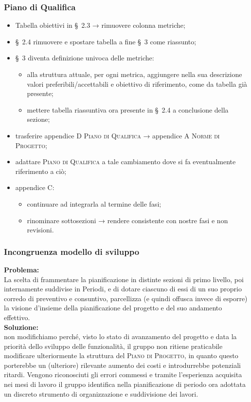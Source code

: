 \subsubsection{Piano di Qualifica}
\begin{itemize}
	\item Tabella obiettivi in \S\ 2.3 → rimuovere colonna metriche;
	
	\item \S\ 2.4 rimuovere e spostare tabella a fine \S\ 3 come riassunto;
	
	\item \S\ 3 diventa definizione univoca delle metriche:
	\begin{itemize}
		\item alla struttura attuale, per ogni metrica, aggiungere nella sua descrizione valori preferibili/accettabili e obiettivo di riferimento, come da tabella già presente;
		\item mettere tabella riassuntiva ora presente in \S\ 2.4 a conclusione della sezione;
	\end{itemize}
	\item trasferire appendice D \textsc{Piano di Qualifica} → appendice A \textsc{Norme di Progetto};
	
	\item adattare \textsc{Piano di Qualifica} a tale cambiamento dove si fa eventualmente riferimento a ciò;
	
	\item appendice C:
	\begin{itemize}
		\item continuare ad integrarla al termine delle fasi;
		
		\item rinominare sottosezioni → rendere consistente con nostre fasi e non revisioni.
	\end{itemize}
	
\end{itemize}

\subsubsection{Incongruenza modello di sviluppo}
\textbf{Problema:}\\
La scelta di frammentare la pianificazione in distinte sezioni di primo livello, poi internamente suddivise in Periodi, e di dotare ciascuno di essi di un suo proprio corredo di preventivo e consuntivo, parcellizza (e quindi offusca invece di esporre) la visione d'insieme della pianificazione del progetto e del suo andamento effettivo.\\
\textbf{Soluzione:}\\
non modifichiamo perché, visto lo stato di avanzamento del progetto e data la priorità dello sviluppo delle funzionalità, il gruppo non ritiene praticabile modificare ulteriormente la struttura del \textsc{Piano di Progetto}, in quanto questo porterebbe un (ulteriore) rilevante aumento dei costi e introdurrebbe potenziali ritardi. Vengono riconosciuti gli errori commessi e tramite l'esperienza acquisita nei mesi di lavoro il gruppo identifica nella pianificazione di periodo ora adottata un discreto strumento di organizzazione e suddivisione dei lavori. 

